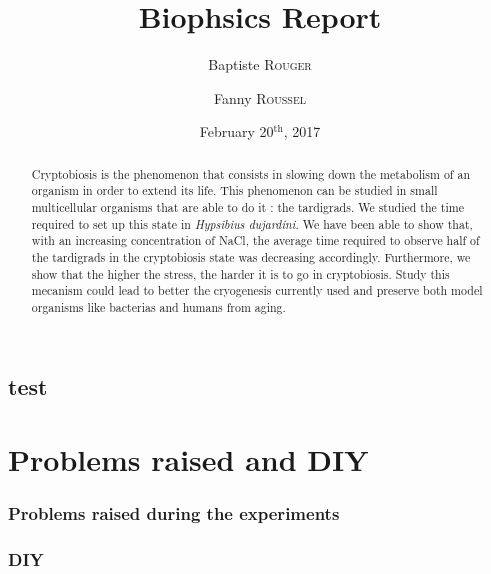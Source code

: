 \documentclass[12pt,a4paper,twocolumn]{report}
\author{Baptiste \textsc{Rouger} \and Fanny \textsc{Roussel}}
\title{Biophsics Report}
\date{February 20$^{\text{th}}$, 2017}
\begin{document}
\maketitle

\begin{abstract}
Cryptobiosis is the phenomenon that consists in slowing down the metabolism of an organism in order to extend its life. This phenomenon can be studied in small multicellular organisms that are able to do it : the tardigrads. We studied the time required to set up this state in \textit{Hypsibius dujardini}. We have been able to show that, with an increasing concentration of NaCl, the average time required to observe half of the tardigrads in the cryptobiosis state was decreasing accordingly. Furthermore, we show that the higher the stress, the harder it is to go in cryptobiosis. Study this mecanism could lead to better the cryogenesis currently used and preserve both model organisms like bacterias and humans from aging.
\end{abstract}

\chapter{test}
\part{Problems raised and DIY}
\section{Problems raised during the experiments}
\lipsum

\section{DIY}
\lipsum
\end{document}
